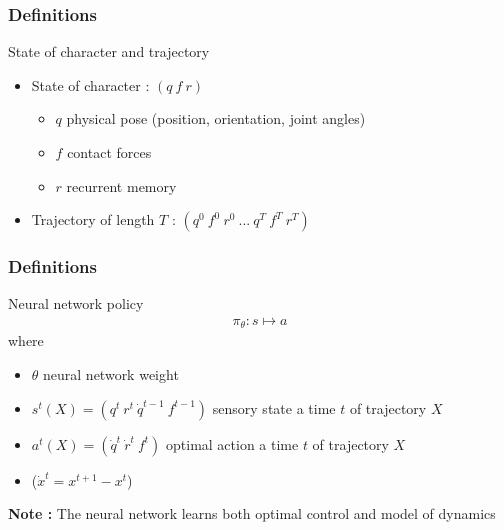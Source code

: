 \documentclass[mathserif]{beamer}
\begin{document}
\begin{frame}
  \frametitle{{Definitions}}
  \begin{block}{State of character and trajectory}
  \begin{itemize}
  \item State of character : $(q~f~r)$ 
  \begin{itemize}
  \item[] $q$ physical pose (position, orientation, joint angles)
  \item[] $f$ contact forces 
  \item[] $r$ recurrent memory
  \end{itemize}
  \item Trajectory of length $T$ : $(q^0~f^0~r^0~...~q^T~f^T~r^T)$ 
  \end{itemize}
  \end{block}
\end{frame}


\begin{frame}
  \frametitle{{Definitions}}
  \begin{block}{Neural network policy }
  \begin{align*}
  \pi_{\theta} : s \mapsto a
  \end{align*}
  where 
  \begin{itemize}
  \item $\theta$ neural network weight
  \item $s^t(X) = (q^t~r^t~\dot{q}^{t-1}~f^{t-1})$  sensory state a time $t$ of trajectory $X$
  \item $a^t(X) = (\dot{q}^{t}~\dot{r}^{t}~f^{t})$ optimal action a time $t$ of trajectory $X$
  \item[] ($\dot{x}^t = x^{t+1}-x^t$)
  \end{itemize}
  \end{block}

\vspace{20pt}

\textbf{Note :} The neural network learns both optimal control and model of dynamics  
  
\end{frame}
\end{document}
